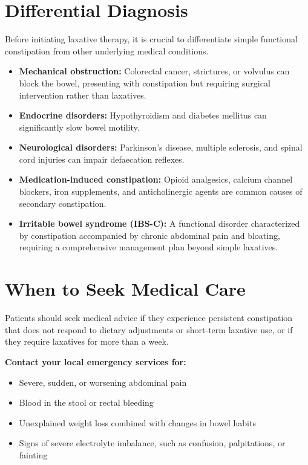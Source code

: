 \section*{Differential Diagnosis}
Before initiating laxative therapy, it is crucial to differentiate simple functional constipation from other underlying medical conditions.
\begin{itemize}
    \item \textbf{Mechanical obstruction:} Colorectal cancer, strictures, or volvulus can block the bowel, presenting with constipation but requiring surgical intervention rather than laxatives.
    \item \textbf{Endocrine disorders:} Hypothyroidism and diabetes mellitus can significantly slow bowel motility.
    \item \textbf{Neurological disorders:} Parkinson's disease, multiple sclerosis, and spinal cord injuries can impair defaecation reflexes.
    \item \textbf{Medication-induced constipation:} Opioid analgesics, calcium channel blockers, iron supplements, and anticholinergic agents are common causes of secondary constipation.
    \item \textbf{Irritable bowel syndrome (IBS-C):} A functional disorder characterized by constipation accompanied by chronic abdominal pain and bloating, requiring a comprehensive management plan beyond simple laxatives.
\end{itemize}

\section*{When to Seek Medical Care}
Patients should seek medical advice if they experience persistent constipation that does not respond to dietary adjustments or short-term laxative use, or if they require laxatives for more than a week.

\textbf{Contact your local emergency services for:}
\begin{itemize}
    \item Severe, sudden, or worsening abdominal pain
    \item Blood in the stool or rectal bleeding
    \item Unexplained weight loss combined with changes in bowel habits
    \item Signs of severe electrolyte imbalance, such as confusion, palpitations, or fainting
\end{itemize}

